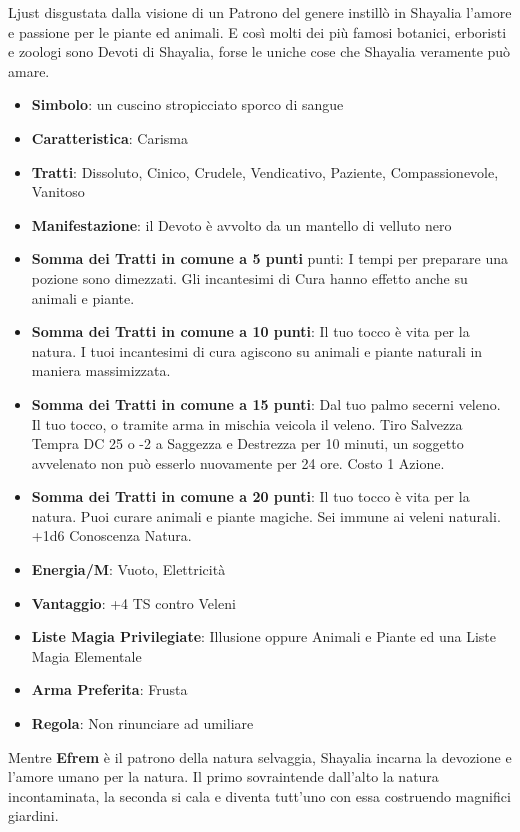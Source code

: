 \begin{multicols}{2}
Ljust disgustata dalla visione di un Patrono del genere instillò in Shayalia l'amore e passione per le piante ed animali. E così molti dei più famosi botanici, erboristi e zoologi sono Devoti di Shayalia, forse le uniche cose che Shayalia veramente può amare.
\begin{itemize}[leftmargin=*] \setlength{\itemsep}{0pt}
\item \textbf{Simbolo}: un cuscino stropicciato sporco di sangue
\item \textbf{Caratteristica}: Carisma
\item \textbf{Tratti}: Dissoluto, Cinico, Crudele, Vendicativo, Paziente, Compassionevole, Vanitoso
\item \textbf{Manifestazione}: il Devoto è avvolto da un mantello di velluto nero
\item \textbf{Somma dei Tratti in comune a 5 punti} punti: I tempi per preparare una pozione sono dimezzati. Gli incantesimi di Cura hanno effetto anche su animali e piante.
\item \textbf{Somma dei Tratti in comune a 10 punti}: Il tuo tocco è vita per la natura. I tuoi incantesimi di cura agiscono su animali e piante naturali in maniera massimizzata.
\item \textbf{Somma dei Tratti in comune a 15 punti}: Dal tuo palmo secerni veleno. Il tuo tocco, o tramite arma in mischia veicola il veleno. Tiro Salvezza Tempra DC 25 o -2 a Saggezza e Destrezza per 10 minuti, un soggetto avvelenato non può esserlo nuovamente per 24 ore. Costo 1 Azione.
\item \textbf{Somma dei Tratti in comune a 20 punti}: Il tuo tocco è vita per la natura. Puoi curare animali e piante magiche. Sei immune ai veleni naturali. +1d6 Conoscenza Natura.
\item \textbf{Energia/M}: Vuoto, Elettricità
\item \textbf{Vantaggio}: +4 TS contro Veleni
\item \textbf{Liste Magia Privilegiate}: Illusione oppure Animali e Piante ed una Liste Magia Elementale
\item \textbf{Arma Preferita}: Frusta
\item \textbf{Regola}: Non rinunciare ad umiliare
\end{itemize}

\medskip

\begin{changemargin}{0.3cm}{0.3cm}\begin{narratore}
Mentre \textbf{Efrem} è il patrono della natura selvaggia, Shayalia incarna la devozione e l'amore umano per la natura. Il primo sovraintende dall'alto la natura incontaminata, la seconda si cala e diventa tutt'uno con essa costruendo magnifici giardini.


\end{narratore}
\end{changemargin}
\end{multicols}
